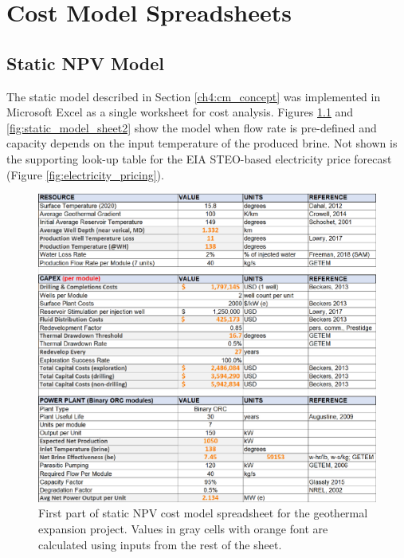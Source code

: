\chapter{Cost Model Spreadsheets}\label{app:B_cost_model_spreadsheets}

\section{Static NPV Model}\label{app:B_static_model}
The static model described in Section \ref{ch4:cm_concept} was implemented in Microsoft Excel as a single worksheet for cost analysis. Figures \ref{fig:static_model_sheet1} and \ref{fig:static_model_sheet2} show the model when flow rate is pre-defined and capacity depends on the input temperature of the produced brine. Not shown is the supporting look-up table for the EIA STEO-based electricity price forecast (Figure \ref{fig:electricity_pricing}).

\begin{figure}[H]
\centering
\includegraphics[width=\textwidth]{templates/images/Figure-Static_Model_SheetA.pdf}
\caption[Static cost model spreadsheet (part 1)]{First part of static NPV cost model spreadsheet for the geothermal expansion project. Values in gray cells with orange font are calculated using inputs from the rest of the sheet.}
\label{fig:static_model_sheet1}
\end{figure}

